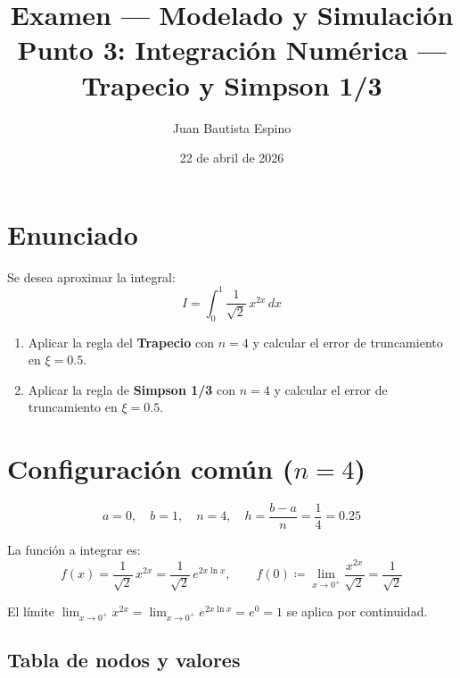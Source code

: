 \documentclass[12pt,a4paper]{article}
\title{\textbf{Examen --- Modelado y Simulaci\'on}\\[0.3em]
       {\large Punto 3: Integraci\'on Num\'erica --- Trapecio y Simpson 1/3}}
\author{Juan Bautista Espino}
\date{22 de abril de 2026}
\begin{document}
\maketitle\thispagestyle{fancy}

\section*{Enunciado}

Se desea aproximar la integral:
\[
  I = \int_0^1 \frac{1}{\sqrt{2}}\, x^{2x}\, dx
\]

\begin{enumerate}
  \item[(a)] Aplicar la regla del \textbf{Trapecio} con $n=4$ y calcular el error de
             truncamiento en $\xi = 0.5$.
  \item[(b)] Aplicar la regla de \textbf{Simpson 1/3} con $n=4$ y calcular el error de
             truncamiento en $\xi = 0.5$.
\end{enumerate}

\section*{Configuraci\'on com\'un ($n=4$)}

\[
  a = 0, \quad b = 1, \quad n = 4, \quad
  h = \frac{b-a}{n} = \frac{1}{4} = 0.25
\]

La funci\'on a integrar es:
\[
  f(x) = \frac{1}{\sqrt{2}}\, x^{2x} = \frac{1}{\sqrt{2}}\, e^{2x\ln x},
  \qquad f(0) \coloneqq \lim_{x\to 0^+} \frac{x^{2x}}{\sqrt{2}} = \frac{1}{\sqrt{2}}
\]

El l\'imite $\lim_{x\to 0^+} x^{2x} = \lim_{x\to 0^+} e^{2x\ln x} = e^0 = 1$
se aplica por continuidad.

\subsection*{Tabla de nodos y valores}
\end{document}
